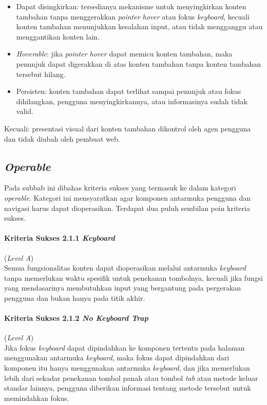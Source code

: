 \begin{itemize}
	\item Dapat disingkirkan: tersedianya mekanisme untuk menyingkirkan konten tambahan tanpa menggerakkan \textit{pointer hover} atau fokus \textit{keyboard}, kecuali konten tambahan menunjukkan kesalahan input, atau tidak mengganggu atau menggantikan konten lain.
	\item \textit{Hoverable}: jika \textit{pointer hover} dapat memicu konten tambahan, maka penunjuk dapat digerakkan di atas konten tambahan tanpa konten tambahan tersebut hilang.
	\item Persisten: konten tambahan dapat terlihat sampai penunjuk atau fokus dihilangkan, pengguna menyingkirkannya, atau informasinya sudah tidak valid.
\end{itemize}

Kecuali: presentasi visual dari konten tambahan dikontrol oleh agen pengguna dan tidak diubah oleh pembuat web.

\subsection{\textit{Operable}}
\label{subsec:kriteria_operable}

Pada subbab ini dibahas kriteria sukses yang termasuk ke dalam kategori \textit{operable}. Kategori ini mensyaratkan agar komponen antarmuka pengguna dan navigasi harus dapat dioperasikan. Terdapat dua puluh sembilan poin kriteria sukses.

\paragraph{Kriteria Sukses 2.1.1 \textit{Keyboard}}
\label{subsec:kriteria_2.1.1}
(\textit{Level A}) \\

Semua fungsionalitas konten dapat dioperasikan melalui antarmuka \textit{keyboard} tanpa memerlukan waktu spesifik untuk penekanan tombolnya, kecuali jika fungsi yang mendasarinya membutuhkan input yang bergantung pada pergerakan pengguna dan bukan hanya pada titik akhir.

\paragraph{Kriteria Sukses 2.1.2 \textit{No Keyboard Trap}}
\label{subsec:kriteria_2.1.2}
(\textit{Level A}) \\

Jika fokus \textit{keyboard} dapat dipindahkan ke komponen tertentu pada halaman menggunakan antarmuka \textit{keyboard}, maka fokus dapat dipindahkan dari komponen itu hanya menggunakan antarmuka \textit{keyboard}, dan jika memerlukan lebih dari sekadar penekanan tombol panah atau tombol \textit{tab} atau metode keluar standar lainnya, pengguna diberikan informasi tentang metode tersebut untuk memindahkan fokus.

